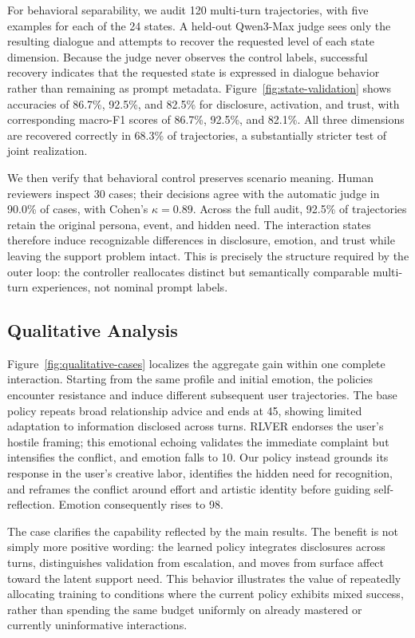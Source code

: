 \documentclass[letterpaper]{article}
\begin{document}
For behavioral separability, we audit 120 multi-turn trajectories, with five examples for each of the 24 states. A held-out Qwen3-Max judge sees only the resulting dialogue and attempts to recover the requested level of each state dimension. Because the judge never observes the control labels, successful recovery indicates that the requested state is expressed in dialogue behavior rather than remaining as prompt metadata. Figure~\ref{fig:state-validation} shows accuracies of 86.7\%, 92.5\%, and 82.5\% for disclosure, activation, and trust, with corresponding macro-F1 scores of 86.7\%, 92.5\%, and 82.1\%. All three dimensions are recovered correctly in 68.3\% of trajectories, a substantially stricter test of joint realization.

We then verify that behavioral control preserves scenario meaning. Human reviewers inspect 30 cases; their decisions agree with the automatic judge in 90.0\% of cases, with Cohen's $\kappa=0.89$. Across the full audit, 92.5\% of trajectories retain the original persona, event, and hidden need. The interaction states therefore induce recognizable differences in disclosure, emotion, and trust while leaving the support problem intact. This is precisely the structure required by the outer loop: the controller reallocates distinct but semantically comparable multi-turn experiences, not nominal prompt labels.

\subsection{Qualitative Analysis}
Figure~\ref{fig:qualitative-cases} localizes the aggregate gain within one complete interaction. Starting from the same profile and initial emotion, the policies encounter resistance and induce different subsequent user trajectories. The base policy repeats broad relationship advice and ends at 45, showing limited adaptation to information disclosed across turns. RLVER endorses the user's hostile framing; this emotional echoing validates the immediate complaint but intensifies the conflict, and emotion falls to 10. Our policy instead grounds its response in the user's creative labor, identifies the hidden need for recognition, and reframes the conflict around effort and artistic identity before guiding self-reflection. Emotion consequently rises to 98.

The case clarifies the capability reflected by the main results. The benefit is not simply more positive wording: the learned policy integrates disclosures across turns, distinguishes validation from escalation, and moves from surface affect toward the latent support need. This behavior illustrates the value of repeatedly allocating training to conditions where the current policy exhibits mixed success, rather than spending the same budget uniformly on already mastered or currently uninformative interactions.
\end{document}
